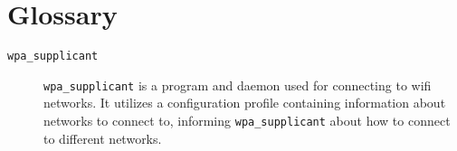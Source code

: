 \section{Glossary}

\begin{description}
  \item[\texttt{wpa\_supplicant}] \texttt{wpa\_supplicant} is a program and daemon
    used for connecting to wifi networks. It utilizes a configuration profile
    containing information about networks to connect to, informing \texttt{wpa\_supplicant}
    about how to connect to different networks.
\end{description}
